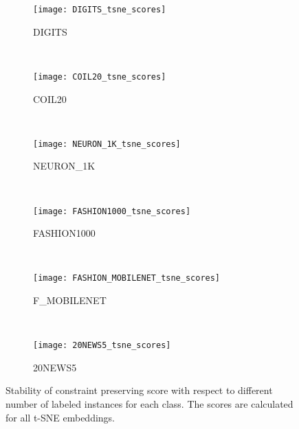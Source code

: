 \begin{figure*}[pos=h]
    \centering
    \begin{subfigure}[b]{0.152\textwidth}
        \centering
        \texttt{[image: DIGITS\_tsne\_scores]}
        \caption{DIGITS}
    \end{subfigure}
    ~
    \begin{subfigure}[b]{0.152\textwidth}
        \texttt{[image: COIL20\_tsne\_scores]}
        \caption{COIL20}
    \end{subfigure}
    ~
    \begin{subfigure}[b]{0.152\textwidth}
        \texttt{[image: NEURON\_1K\_tsne\_scores]}
        \caption{NEURON\_1K}
    \end{subfigure}
    ~
    \begin{subfigure}[b]{0.152\textwidth}
        \centering
        \texttt{[image: FASHION1000\_tsne\_scores]}
        \caption{FASHION1000}
    \end{subfigure}
    ~
    \begin{subfigure}[b]{0.152\textwidth}
        \texttt{[image: FASHION\_MOBILENET\_tsne\_scores]}
        \caption{F\_MOBILENET}
    \end{subfigure}
    ~
    \begin{subfigure}[b]{0.152\textwidth}
        \texttt{[image: 20NEWS5\_tsne\_scores]}
        \caption{20NEWS5}
    \end{subfigure}
    \caption{Stability of constraint preserving score with respect to different number of labeled instances for each class. The scores are calculated for all t-SNE embeddings.}
    \label{fig:score:tsne:stability:annex}
\end{figure*}


